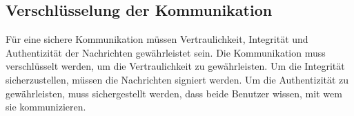 \subsection{Verschlüsselung der Kommunikation}


Für eine sichere Kommunikation müssen Vertraulichkeit, Integrität und Authentizität der Nachrichten gewährleistet sein. Die Kommunikation muss verschlüsselt werden, um die Vertraulichkeit zu gewährleisten. Um die Integrität sicherzustellen, müssen die Nachrichten signiert werden. Um die Authentizität zu gewährleisten, muss sichergestellt werden, dass beide Benutzer wissen, mit wem sie kommunizieren.  
